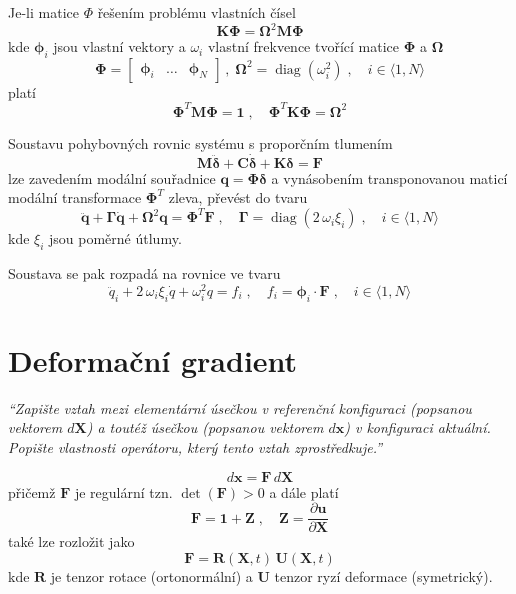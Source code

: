 \documentclass{article}
\begin{document}
	Je-li matice $\Phi$ řešením problému vlastních čísel
	\begin{equation}
		\bm{K}\bm{\Phi} = \bm{\Omega}^2 \bm{M} \bm{\Phi}
	\end{equation}
	kde $\bm{\phi}_i$ jsou vlastní vektory a $\omega_i$ vlastní frekvence tvořící matice $\bm{\Phi}$ a $\bm{\Omega}$  
	\begin{equation}
		\bm{\Phi} = \begin{bmatrix} \bm{\phi}_i & \dots & \bm{\phi}_N \end{bmatrix}
		\,,\;
		\bm{\Omega}^2 = \operatorname{diag}(\omega_i^2)
		\;,\quad 
		i \in \langle 1,N \rangle
	\end{equation}
	platí
	\begin{equation}
		\bm{\Phi}^T\bm{M}\bm{\Phi} = \bm{1}
		\;,\quad 
		\bm{\Phi}^T\bm{K}\bm{\Phi} = \bm{\Omega}^2
	\end{equation}

	Soustavu pohybovných rovnic systému s proporčním tlumením
	\begin{equation}
		\bm{M}\bm{\ddot{\delta}} + \bm{C}\bm{\dot{\delta}} + \bm{K}\bm{\delta} = \bm{F}
	\end{equation}
	lze zavedením modální souřadnice $\bm{q} = \bm{\Phi}\bm{\delta}$ a vynásobením transponovanou maticí modální transformace $\bm{\Phi}^T$ zleva, převést do tvaru
	\begin{equation}
		\bm{\ddot{q}} + \bm{\Gamma}\bm{\dot{q}} + \bm{\Omega}^2 \bm{q} = \bm{\Phi}^T \bm{F}
		\;,\quad 
		\bm{\Gamma} = \operatorname{diag}(2\,\omega_i\xi_i) \;,\quad i \in \langle 1,N \rangle
	\end{equation}
	kde $\xi_i$ jsou poměrné útlumy.

	Soustava se pak rozpadá na rovnice ve tvaru
	\begin{equation}
		\ddot{q}_i + 2\,\omega_i\xi_i \dot{q} + \omega_i^2 q = f_i
		\;,\quad 
		f_i = \bm{\phi}_i \cdot \bm{F}
		\;,\quad 
		i \in \langle 1,N \rangle
	\end{equation}

	\section{Deformační gradient}
	\emph{``Zapište vztah mezi elementární úsečkou v referenční konfiguraci (popsanou vektorem $d\bm{X}$) a toutéž úsečkou (popsanou vektorem $d\bm{x}$) v konfiguraci aktuální. Popište vlastnosti operátoru, který tento vztah zprostředkuje.''}

	\begin{equation}
		d\bm{x} = \bm{F} \, d\bm{X}
	\end{equation}
	přičemž $\bm{F}$ je regulární tzn. $\det(\bm{F}) > 0$ a dále platí
	\begin{equation}
	\bm{F} = \bm{1} + \bm{Z}
	\;,\quad 
	\bm{Z} = \frac{\partial \bm{u}}{\partial \bm{X}}
	\end{equation}
	také lze rozložit jako
	\begin{equation}
	\bm{F} = \bm{R}(\bm{X},t)\,\bm{U}(\bm{X},t)
	\end{equation}
	kde $\bm{R}$ je tenzor rotace (ortonormální) a $\bm{U}$ tenzor ryzí deformace (symetrický).
	
\end{document}
